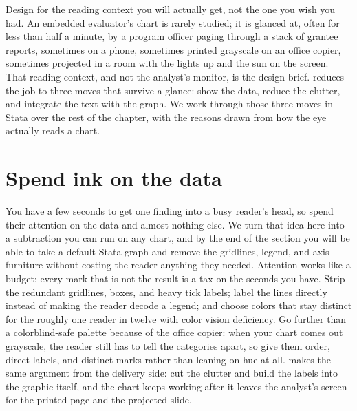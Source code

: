 \documentclass[
    a4paper,
    fontsize=10pt,
    twoside=true,
    numbers=noenddot,
]{kaobook}
\begin{document}
Design for the reading context you will actually get, not the one you wish you had. An embedded evaluator's chart is rarely studied; it is glanced at, often for less than half a minute, by a program officer paging through a stack of grantee reports, sometimes on a phone, sometimes printed grayscale on an office copier, sometimes projected in a room with the lights up and the sun on the screen. That reading context, and not the analyst's monitor, is the design brief. \textcite{schwabish2014economist} reduces the job to three moves that survive a glance: show the data, reduce the clutter, and integrate the text with the graph. We work through those three moves in Stata over the rest of the chapter, with the reasons drawn from how the eye actually reads a chart.

\section{Spend ink on the data}
You have a few seconds to get one finding into a busy reader's head, so spend their attention on the data and almost nothing else. We turn that idea here into a subtraction you can run on any chart, and by the end of the section you will be able to take a default Stata graph and remove the gridlines, legend, and axis furniture without costing the reader anything they needed. Attention works like a budget: every mark that is not the result is a tax on the seconds you have. Strip the redundant gridlines, boxes, and heavy tick labels; label the lines directly instead of making the reader decode a legend; and choose colors that stay distinct for the roughly one reader in twelve with color vision deficiency. Go further than a colorblind-safe palette because of the office copier: when your chart comes out grayscale, the reader still has to tell the categories apart, so give them order, direct labels, and distinct marks rather than leaning on hue at all. \textcite{schwabish2014economist} makes the same argument from the delivery side: cut the clutter and build the labels into the graphic itself, and the chart keeps working after it leaves the analyst's screen for the printed page and the projected slide.
\end{document}

